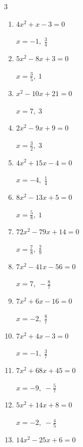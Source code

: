 \begin{multicols}{3}
\begin{enumerate}
        $\displaystyle x=-\frac{1}{3},\; -\frac{3}{7}$

  \item $4x^{2}+x-3=0$

        $\displaystyle x=-1,\; \frac{3}{4}$

  \item $5x^{2}-8x+3=0$

        $\displaystyle x=\frac{3}{5},\; 1$

\columnbreak %

  \item $x^{2}-10x+21=0$

        $\displaystyle x=7,\; 3$

  \item $2x^{2}-9x+9=0$

        $\displaystyle x=\frac{3}{2},\; 3$

  \item $4x^{2}+15x-4=0$

        $\displaystyle x=-4,\; \frac{1}{4}$

  \item $8x^{2}-13x+5=0$

        $\displaystyle x=\frac{5}{8},\; 1$

  \item $72x^{2}-79x+14=0$

        $\displaystyle x=\frac{7}{8},\; \frac{2}{9}$

  \item $7x^{2}-41x-56=0$

        $\displaystyle x=7,\; -\frac{8}{7}$

  \item $7x^{2}+6x-16=0$

        $\displaystyle x=-2,\; \frac{8}{7}$

  \item $7x^{2}+4x-3=0$

        $\displaystyle x=-1,\; \frac{3}{7}$

  \item $7x^{2}+68x+45=0$

        $\displaystyle x=-9,\; -\frac{5}{7}$

  \item $5x^{2}+14x+8=0$

        $\displaystyle x=-2,\; -\frac{4}{5}$

\columnbreak %

  \item $14x^{2}-25x+6=0$


\end{enumerate}
\end{multicols}
